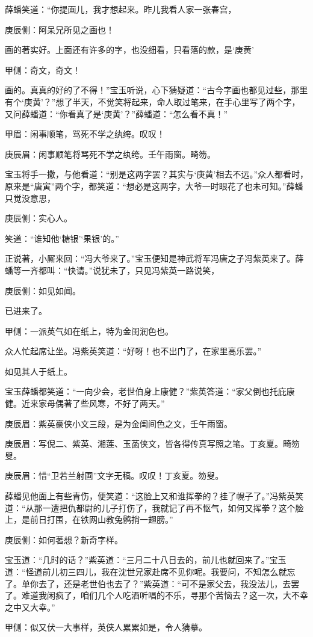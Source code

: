 \begin{parag}
    薛蟠笑道：“你提画儿，我才想起来。昨儿我看人家一张春宫，\begin{note}庚辰侧：阿呆兄所见之画也！\end{note}画的著实好。上面还有许多的字，也没细看，只看落的款，是‘庚黄’\begin{note}甲侧：奇文，奇文！\end{note}画的。真真的好的了不得！”宝玉听说，心下猜疑道：“古今字画也都见过些，那里有个‘庚黄’？”想了半天，不觉笑将起来，命人取过笔来，在手心里写了两个字，又问薛蟠道：“你看真了是‘庚黄’？”薛蟠道：“怎么看不真！”\begin{note}甲眉：闲事顺笔，骂死不学之纨绔。叹叹！\end{note}\begin{note}庚辰眉：闲事顺笔将骂死不学之纨绔。壬午雨窗。畸笏。\end{note}宝玉将手一撒，与他看道：“别是这两字罢？其实与‘庚黄’相去不远。”众人都看时，原来是“唐寅”两个字，都笑道：“想必是这两字，大爷一时眼花了也未可知。”薛蟠只觉没意思，\begin{note}庚辰侧：实心人。\end{note}笑道：“谁知他‘糖银’‘果银’的。”
\end{parag}


\begin{parag}
    正说著，小厮来回：“冯大爷来了。”宝玉便知是神武将军冯唐之子冯紫英来了。薛蟠等一齐都叫：“快请。”说犹未了，只见冯紫英一路说笑，\begin{note}庚辰侧：如见如闻。\end{note}已进来了。\begin{note}甲侧：一派英气如在纸上，特为金闺润色也。\end{note}众人忙起席让坐。冯紫英笑道：“好呀！也不出门了，在家里高乐罢。”\begin{note}如见其人于纸上。\end{note}宝玉薛蟠都笑道：“一向少会，老世伯身上康健？”紫英答道：“家父倒也托庇康健。近来家母偶著了些风寒，不好了两天。”\begin{note}庚辰眉：紫英豪侠小文三段，是为金闺间色之文，壬午雨窗。\end{note}\begin{note}庚辰眉：写倪二、紫英、湘莲、玉菡侠文，皆各得传真写照之笔。丁亥夏。畸笏叟。\end{note}\begin{note}庚辰眉：惜“卫若兰射圃”文字无稿。叹叹！丁亥夏。笏叟。\end{note}薛蟠见他面上有些青伤，便笑道：“这脸上又和谁挥拳的？挂了幌子了。”冯紫英笑道：“从那一遭把仇都尉的儿子打伤了，我就记了再不怄气，如何又挥拳？这个脸上，是前日打围，在铁网山教兔鹘捎一翅膀。”\begin{note}庚辰侧：如何著想？新奇字样。\end{note}宝玉道：“几时的话？”紫英道：“三月二十八日去的，前儿也就回来了。”宝玉道：“怪道前儿初三四儿，我在沈世兄家赴席不见你呢。我要问，不知怎么就忘了。单你去了，还是老世伯也去了？”紫英道：“可不是家父去，我没法儿，去罢了。难道我闲疯了，咱们几个人吃酒听唱的不乐，寻那个苦恼去？这一次，大不幸之中又大幸。”\begin{note}甲侧：似又伏一大事样，英侠人累累如是，令人猜摹。\end{note}
\end{parag}


